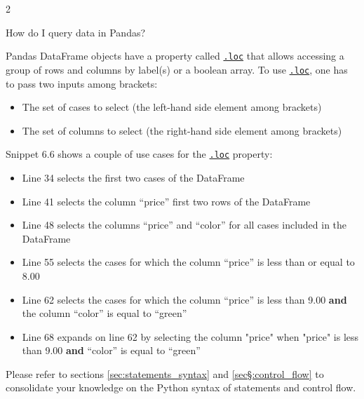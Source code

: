 \documentclass[a4paper,11pt]{book}
\newcommand{\question}[1]{%
    \begin{tcolorbox}[colback=comp_c!10,colframe=comp_c,sidebyside align=top,width=\linewidth,before skip=1ex]
        #1
    \end{tcolorbox}
    \switchcolumn%
}
\newcommand{\note}[1]{%
    \begin{tcolorbox}[colback=white!0,colframe=white!10,width=\linewidth,before skip=1ex]
        #1
    \end{tcolorbox}
}
\begin{document}
\begin{paracol}{2}
	\question{\raggedright How do I query data in Pandas?}
	\note{Pandas DataFrame objects have a property called \href{https://pandas.pydata.org/docs/reference/api/pandas.DataFrame.loc.html?highlight=loc\#pandas.DataFrame.loc}{\texttt{.loc}} that allows accessing a group of rows and columns by label(s) or a boolean array. To use \href{https://pandas.pydata.org/docs/reference/api/pandas.DataFrame.loc.html?highlight=loc\#pandas.DataFrame.loc}{\texttt{.loc}}, one has to pass two inputs among brackets:
	
	\begin{itemize}
		\item The set of cases to select (the left-hand side element among brackets)
		\item The set of columns to select (the right-hand side element among brackets)
	\end{itemize}

	\quad Snippet 6.6 shows a couple of use cases for the \href{https://pandas.pydata.org/docs/reference/api/pandas.DataFrame.loc.html?highlight=loc\#pandas.DataFrame.loc}{\texttt{.loc}} property:

	\begin{itemize}
		\item Line 34 selects the first two cases of the DataFrame
		\item Line 41 selects the column ``price'' first two rows of the DataFrame
		\item Line 48 selects  the columns ``price'' and ``color'' for all cases included in the DataFrame
		\item Line 55 selects the cases for which the column ``price'' is less than or equal to 8.00
		\item Line 62 selects the cases for which the column ``price'' is less than 9.00 \textbf{and} the column ``color'' is equal to ``green''
		\item Line 68 expands on line 62 by selecting the column "price" when "price" is less than 9.00 \textbf{and} ``color'' is equal to ``green''
	\end{itemize}

	\quad Please refer to sections \ref{sec:statements_syntax} and \ref{sec§:control_flow} to consolidate your knowledge on the Python syntax of statements and control flow.
	}
\end{paracol}
\end{document}
